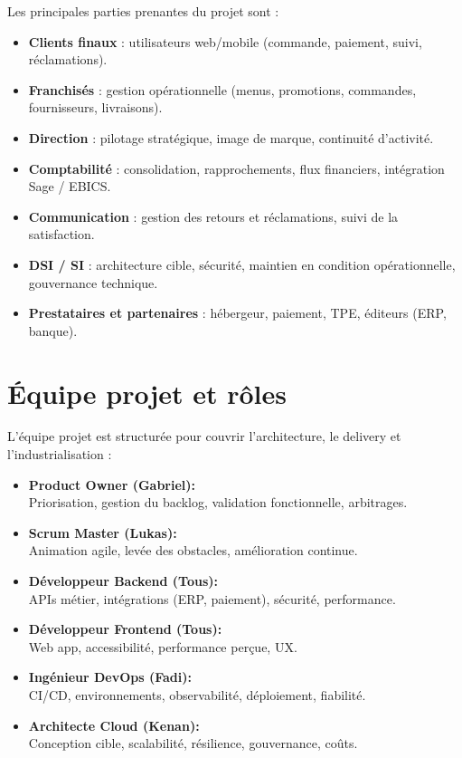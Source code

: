 Les principales parties prenantes du projet sont :
\begin{itemize}
    \item \textbf{Clients finaux} : utilisateurs web/mobile (commande, paiement, suivi, réclamations).
    \item \textbf{Franchisés} : gestion opérationnelle (menus, promotions, commandes, fournisseurs, livraisons).
    \item \textbf{Direction} : pilotage stratégique, image de marque, continuité d’activité.
    \item \textbf{Comptabilité} : consolidation, rapprochements, flux financiers, intégration Sage / EBICS.
    \item \textbf{Communication} : gestion des retours et réclamations, suivi de la satisfaction.
    \item \textbf{DSI / SI} : architecture cible, sécurité, maintien en condition opérationnelle, gouvernance technique.
    \item \textbf{Prestataires et partenaires} : hébergeur, paiement, TPE, éditeurs (ERP, banque).
\end{itemize}

\section{Équipe projet et rôles}

L’équipe projet est structurée pour couvrir l’architecture, le delivery et l’industrialisation :
\begin{itemize}[leftmargin=0pt,label={},itemsep=0.6em]
  \item \textbf{Product Owner (Gabriel):}\\
  {\small Priorisation, gestion du backlog, validation fonctionnelle, arbitrages.}

  \item \textbf{Scrum Master (Lukas):}\\
  {\small Animation agile, levée des obstacles, amélioration continue.}

  \item \textbf{Développeur Backend (Tous):}\\
  {\small APIs métier, intégrations (ERP, paiement), sécurité, performance.}

  \item \textbf{Développeur Frontend (Tous):}\\
  {\small Web app, accessibilité, performance perçue, UX.}

  \item \textbf{Ingénieur DevOps (Fadi):}\\
  {\small CI/CD, environnements, observabilité, déploiement, fiabilité.}

  \item \textbf{Architecte Cloud (Kenan):}\\
  {\small Conception cible, scalabilité, résilience, gouvernance, coûts.}
\end{itemize}

